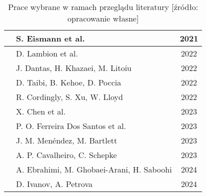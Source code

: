\begin{table}[!ht]
\begin{tabular}{|c|l|c|}
    \hline
    \cite{eismann2021reviewserverlessusecases} & S. Eismann et al. & 2021 \\
    \hline
    \cite{10.1145/3491204.3543506} & D. Lambion et al. & 2022 \\
    \hline
    \cite{9860368} & J. Dantas, H. Khazaei, M. Litoiu & 2022 \\
    \hline
    \cite{9912641} & D. Taibi, B. Kehoe, D. Poccia & 2022 \\
    \hline
    \cite{9946331} & R. Cordingly, S. Xu, W. Lloyd & 2022 \\
    \hline
    \cite{10.1145/3631295.3631394} & X. Chen et al. & 2023 \\
    \hline
    \cite{FerreiraDosSantos2023} & P. O. Ferreira Dos Santos et al. & 2023 \\
    \hline
    \cite{menéndez2023performancebestpracticesusing} & J. M. Menéndez, M. Bartlett & 2023 \\
    \hline
    \cite{Cavalheiro202389} & A. P. Cavalheiro, C. Schepke & 2023 \\
    \hline
    \cite{EBRAHIMI2024103115} & A. Ebrahimi, M. Ghobaei-Arani, H. Saboohi & 2024 \\
    \hline
    \cite{Ivanov_Petrova_2024} & D. Ivanov, A. Petrova & 2024 \\
    \hline
    \end{tabular}
    \caption{Prace wybrane w ramach przeglądu literatury [źródło: opracowanie własne]}
    \label{table:research_papers_results}
\end{table}
